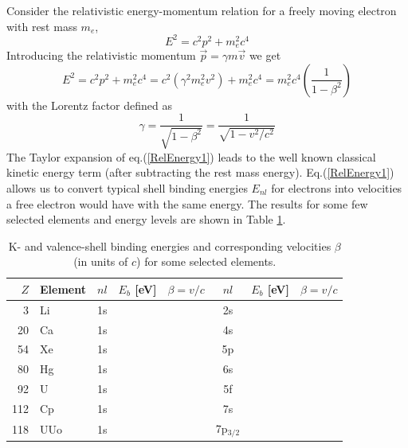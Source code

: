\documentclass[12pt]{article}
\begin{document}
Consider the relativistic energy-momentum relation for a freely moving electron with rest mass $m_e$,
\begin{equation}
   E^2 = c^2p^2 + m_e^2c^4
   \label{RelEnergy}
\end{equation}
Introducing the relativistic momentum $\vec{p}=\gamma m\vec{v}$ we get
\begin{equation}
   E^2  = c^2p^2 + m_e^2c^4 = c^2\left(\gamma^2m_e^2v^2\right) + m_e^2c^4 = m_e^2c^4  \left(\frac{1}{1-\beta^2}\right)
   \label{RelEnergy1}
\end{equation}
with the Lorentz factor defined as
\begin{equation}
   \gamma = \frac{1}{\sqrt{1-\beta^2}} = \frac{1}{\sqrt{1-v^2/c^2}}
   \label{Lorentzfactor}
\end{equation}
The Taylor expansion of eq.(\ref{RelEnergy1}) leads to the well known classical kinetic energy term (after subtracting the rest mass energy). Eq.(\ref{RelEnergy1}) allows us to convert typical shell binding energies $E_{nl}$ for electrons into velocities a free electron would have with the same energy. The results for some few selected elements and energy levels are shown in Table \ref{tab:LevelEnergies}.
\begin{table}
\footnotesize
  \begin{tabular}{|r|l|c|r|r|c|r|r|}
    \toprule
    $Z$ & Element & $nl$ & $E_b$ [eV] & $\beta=v/c$  & $nl$ & $E_b$ [eV] & $\beta=v/c$ \\
    \midrule
 3   & Li 	& 1s   & 	&   & 2s   		& 		&\\
 20  & Ca 	& 1s   & 	&   & 4s   		& 		&\\
 54  & Xe 	& 1s   & 	&  	& 5p   		& 		&\\    
 80  & Hg 	& 1s   & 	&  	& 6s   		& 		&\\
 92  & U  	& 1s   & 	&  	& 5f   		& 		&\\
112  & Cp  	& 1s   & 	&   & 7s   		& 		&\\     
118  & UUo  & 1s   & 	&   & 7p$_{3/2}$& 		&\\
    \bottomrule
  \end{tabular}
  \caption{K- and valence-shell binding energies and corresponding velocities $\beta$ (in units of $c$) for some selected elements.}
  \label{tab:LevelEnergies}
\end{table}
\end{document}
